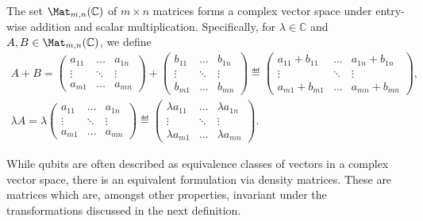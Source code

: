 \documentclass[a4paper,oneside, 12pt]{amsart}
\begin{document}
\begin{remark}\label{rmk:matrices-are-a-vector-space}
  The set \( \Mat_{m,n}(\mathbb{C}) \) of \( m \times n \) matrices forms a complex vector space under entry-wise addition and scalar multiplication.
  Specifically, for \( \lambda \in \mathbb{C} \) and \( A, B \in \Mat_{m,n}(\mathbb{C}) \), we define
  \begin{subequations}
    \begin{gather}
      A + B =
      \begin{pmatrix}
        a_{11} & \dots &  a_{1n} \\
        \vdots & \ddots & \vdots \\
        a_{m1} & \dots &  a_{mn}
      \end{pmatrix}
      +
      \begin{pmatrix}
        b_{11} & \dots &  b_{1n} \\
        \vdots & \ddots & \vdots \\
        b_{m1} & \dots &  b_{mn}
      \end{pmatrix}
      \eqdef \begin{pmatrix}
        a_{11} + b_{11} & \dots & a_{1n} + b_{1n} \\
        \vdots & \ddots & \vdots \\
        a_{m1} + b_{m1} & \dots & a_{mn} + b_{mn}
      \end{pmatrix}, \\
      \lambda A =
      \lambda
      \begin{pmatrix}
        a_{11} & \dots &  a_{1n} \\
        \vdots & \ddots & \vdots \\
        a_{m1} & \dots &  a_{mn}
      \end{pmatrix}
      \eqdef \begin{pmatrix}
        \lambda a_{11} & \dots & \lambda a_{1n} \\
        \vdots & \ddots & \vdots \\
        \lambda a_{m1} & \dots & \lambda a_{mn}
      \end{pmatrix}.
    \end{gather}
  \end{subequations}
\end{remark}

While qubits are often described as equivalence classes of vectors in a complex vector space, there is an equivalent formulation via density matrices.
These are matrices which are, amongst other properties, invariant under the transformations discussed in the next definition.
\end{document}
